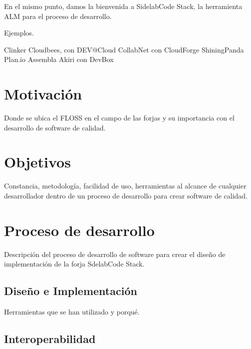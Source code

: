 \documentclass[11pt]{scrartcl}
\begin{document}
\par En el mismo punto, damos la bienvenida a SidelabCode Stack, la herramienta ALM para el proceso de desarrollo. 


\par Ejemplos.

Clinker
Cloudbees, con DEV@Cloud
CollabNet con CloudForge
ShiningPanda
Plan.io
Assembla
Akiri con DevBox


\section{Motivaci\'on}
\label{sec:motivacion}

\par Donde se ubica el FLOSS en el campo de las forjas y su importancia con el desarrollo de software de calidad.


\section{Objetivos}
\label{sec:objetivos}

\par Constancia, metodolog\'ia, facilidad de uso, herramientas al alcance de cualquier desarrollador dentro de un proceso de desarrollo para crear software de calidad.


\section{Proceso de desarrollo}
\label{sec:procesodesarrollo}

\par Descripci\'on del proceso de desarrollo de software para crear el diseño de implementaci\'on de la forja SdelabCode Stack.

\subsection{Dise\~no e Implementaci\'on}
\label{sub:diseno}

\par Herramientas que se han utilizado y porqu\'e.


\subsection{Interoperabilidad}
\label{sub:interoperabilidad}
\end{document}
